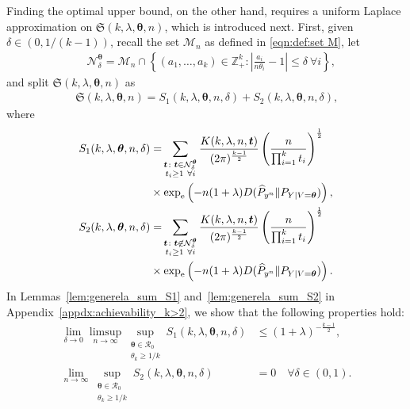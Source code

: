 \documentclass[journal, 10pt]{IEEEtran}
\newcommand{\bbZ}{\mathbb{Z}}
\newcommand{\rme}{\mathrm{e}}
\newcommand{\cM}{\mathcal{M}}
\newcommand{\cN}{\mathcal{N}}
\newcommand{\cR}{\mathcal{R}}
\newcommand{\mfrakS}{\mathfrak{S}}
\theoremstyle{plain}
\theoremstyle{plain}
\theoremstyle{plain}
\theoremstyle{plain}
\newcommand{\boldtheta}{\mathbold{\theta}}
\newcommand{\boldt}{\mathbold{t}}
\begin{document}
\begin{IEEEproof}
Finding the optimal upper bound, on the other hand, requires a uniform Laplace approximation on $\mfrakS(k, \lambda, \boldtheta, n)$, which is introduced next. First, given $\delta\in (0,1/(k-1))$, recall the set $\cM_n$ as defined in \eqref{eqn:def:set M}, let 
\begin{align}
&\cN^\boldtheta_\delta = \cM_n \cap \left\{ (a_1, \hdots, a_k)\in \bbZ^k_+ \colon  \left|\frac{a_i}{n\theta_i}-1\right|\le \delta \ \forall i \right\}\text{,}\label{eqn:defn:N-delta}
\end{align}
and split $\mfrakS(k,\lambda, \boldtheta, n) $ as
\begin{align}
\mfrakS(k, \lambda, \boldtheta, n) = S_1(k, \lambda, \boldtheta,n,\delta)+S_2(k, \lambda, \boldtheta,n,\delta)\text{,} \label{eqn:S1_plus_S2}
\end{align} 
where
\begin{align}
S_1(k, \lambda, \boldtheta,n,\delta) &= \hspace{-0.4mm} \sum_{\substack{\boldt \colon \boldt \in \cN^\boldtheta_\delta\\ t_i\ge 1 \ \forall i}}  \frac{K(k,\lambda, n, \boldt)}{(2\pi)^{\frac{k-1}{2}} } \left(\frac{n}{\prod_{i=1}^{k}t_i}\right)^\frac12 \label{eqn:def:general-S1} \\
&\times \exp_\rme\left(-n(1+\lambda)D(\widehat{P}_{y^n}\| P_{Y|V=\boldtheta})\right)\text{,} \nonumber  \\
S_2(k, \lambda, \boldtheta,n,\delta) &= \hspace{-0.4mm} \sum_{\substack{\boldt \colon \boldt \not\in \cN^\boldtheta_\delta \\ t_i\ge 1 \ \forall i}}  \frac{K(k,\lambda, n, \boldt)}{(2\pi)^{\frac{k-1}{2}} } \left(\frac{n}{\prod_{i=1}^{k}t_i}\right)^\frac12 \label{eqn:def:general-S2} \\  
&\times \exp_\rme\left(-n(1+\lambda)D(\widehat{P}_{y^n}\| P_{Y|V=\boldtheta})\right)\text{.}  \nonumber
\end{align}
In Lemmas~\ref{lem:generela_sum_S1} and~\ref{lem:generela_sum_S2} in Appendix~\ref{appdx:achievability_k>2}, we show that the following properties hold:
\begin{align}
\lim_{\delta \to 0}\limsup_{n\to \infty} \sup_{\substack{\boldtheta \in \cR_0 \\ \theta_k \ge 1/k}} S_1(k, \lambda, \boldtheta,n,\delta)  &\le (1+\lambda)^{-\frac{k-1}{2}}\text{,} \label{eqn:reslt:general-S1} \\
\lim_{n \to \infty}\sup_{\substack{\boldtheta \in \cR_0 \\ \theta_k \ge 1/k}} S_2(k, \lambda, \boldtheta,n,\delta) &=0 \quad \forall \delta \in (0,1) \text{.} \label{eqn:reslt:general-S2}

\end{align}
\end{IEEEproof}
\end{document}
